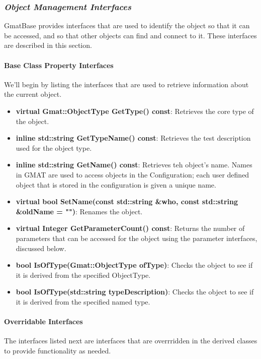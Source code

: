 \subsubsection{\textit{Object Management Interfaces}}

GmatBase provides interfaces that are used to identify the object so that it can be accessed, and so
that other objects can find and connect to it.  These interfaces are described in this section.

\paragraph{Base Class Property Interfaces}

We'll begin by listing the interfaces that are used to retrieve information about the current
object.

\begin{itemize}
\item \textbf{virtual Gmat::ObjectType GetType() const}: Retrieves the core type of the object.
\item \textbf{inline std::string GetTypeName() const}: Retrieves the test description used for the
object type.
\item \textbf{inline std::string GetName() const}: Retrieves teh object's name.  Names in GMAT are
used to access objects in the Configuration; each user defined object that is stored in the
configuration is given a unique name.
\item \textbf{virtual bool SetName(const std::string \&who, const std::string \&oldName = "")}:
Renames the object.
\item \textbf{virtual Integer GetParameterCount() const}: Returns the number of parameters that can
be accessed for the object using the parameter interfaces, discussed below.
\item \textbf{bool IsOfType(Gmat::ObjectType ofType)}: Checks the object to see if it is derived
from the specified ObjectType.
\item \textbf{bool IsOfType(std::string typeDescription)}: Checks the object to see if it is derived
from the specified named type.
\end{itemize}

\paragraph{Overridable Interfaces}

The interfaces listed next are interfaces that are overrridden in the derived classes to provide
functionality as needed.

